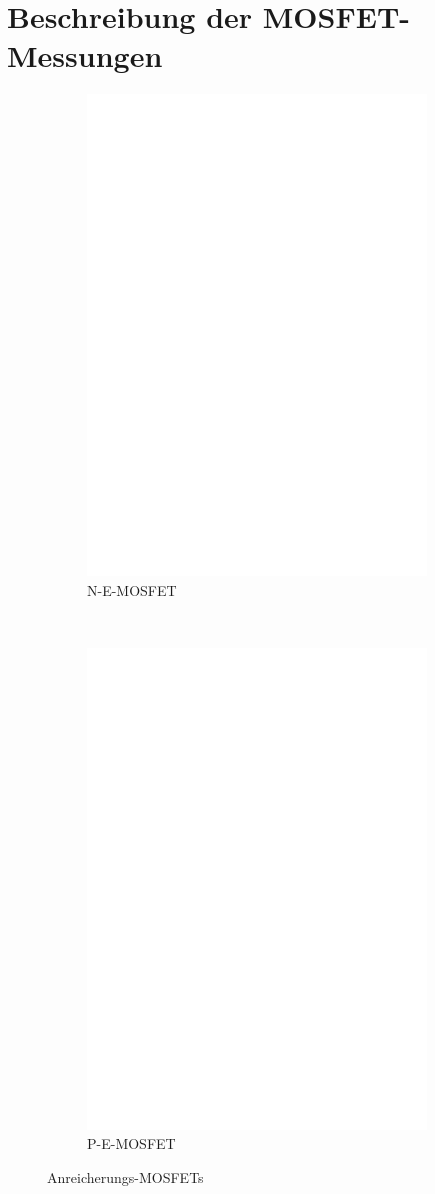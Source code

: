 \chapter{Beschreibung der MOSFET-Messungen}
\label{sec:MOSmeasurements}

\begin{figure}[H]
  \begin{subfigure}[b]{9cm}
    \centering
    \includegraphics[width=9cm]{../FIG/MOS_BUZ71.eps}
    \caption{N-E-MOSFET}
    \label{fig:MOS-N-E}
  \end{subfigure}
  ~
  \begin{subfigure}[b]{9cm}
    \centering
    \includegraphics[width=9cm]{../FIG/MOS_IRF5305.eps}
    \caption{P-E-MOSFET}
    \label{fig:MOS-P-E}
  \end{subfigure}
  \caption{Anreicherungs-MOSFETs}
\end{figure}



